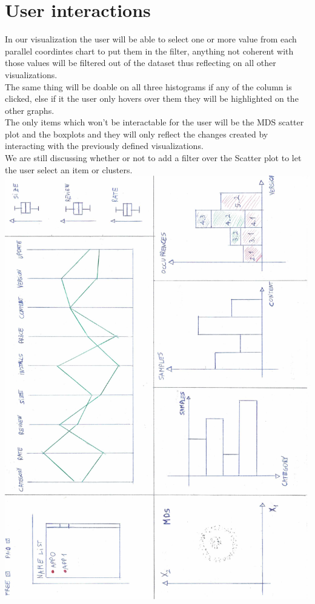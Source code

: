 \documentclass[a4paper, 11pt]{article}
\begin{document}
\section{User interactions}
In our visualization the user will be able to select one or more value from each parallel coordintes chart to put them in the filter, anything not coherent with those values will be filtered out of the dataset thus reflecting on all other visualizations.\\
The same thing will be doable on all three histograms if any of the column is clicked, else if it the user only hovers over them they will be highlighted on the other graphs.\\
The only items which won't be interactable for the user will be the MDS scatter plot and the boxplots and they will only reflect the changes created by interacting with the previously defined visualizations. \\
We are still discussing whether or not to add a filter over the Scatter plot to let the user select an item or clusters.
\includegraphics[width=\textwidth, angle=180]{mockup.png}
\end{document}
